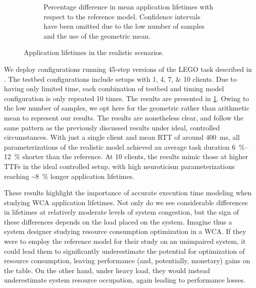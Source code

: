\begin{figure}
\begin{subfigure}[]{\columnwidth}
        \caption{%
            Percentage difference in mean application lifetimes with respect to the reference model.
            Confidence intervals have been omitted due to the low number of samples and the use of the geometric mean.
        }
    \end{subfigure}
    \caption{Application lifetimes in the realistic scenarios.}\label{fig:testbed_lifetimes}
\end{figure}

We deploy configurations running \num{45}-step versions of the LEGO task described in \textcite{olguinmunoz:impact2021}.
The testbed configurations include setups with \numlist{1;4;7;10} clients.
Due to having only limited time, each combination of testbed and timing model configuration is only repeated \num{10} times.
The results are presented in \cref{fig:testbed_lifetimes}.
Owing to the low number of samples, we opt here for the geometric rather than arithmetic mean to represent our results.
The results are nonetheless clear, and follow the same pattern as the previously discussed results under ideal, controlled circumstances.
With just a single client and mean \ac{RTT} of around \SI{400}{\milli\second}, all parameterizations of the realistic model achieved an average task duration \SIrange{6}{12}{\percent} shorter than the reference.
At \num{10} clients, the results mimic those at higher \acp{TTF} in the ideal controlled setup, with high neuroticism parameterizations reaching \textasciitilde\SI{8}{\percent} longer application lifetimes.

These results highlight the importance of accurate execution time modeling when studying \ac{WCA} application lifetimes.
Not only do we see considerable differences in lifetimes at relatively moderate levels of system congestion, but the sign of these differences depends on the load placed on the system.
Imagine thus a system designer studying resource consumption optimization in a \ac{WCA}.
If they were to employ the reference model for their study on an unimpaired system, it could lead them to significantly underestimate the potential for optimization of resource consumption, leaving performance (and, potentially, monetary) gains on the table.
On the other hand, under heavy load, they would instead underestimate system resource occupation, again leading to performance losses.



